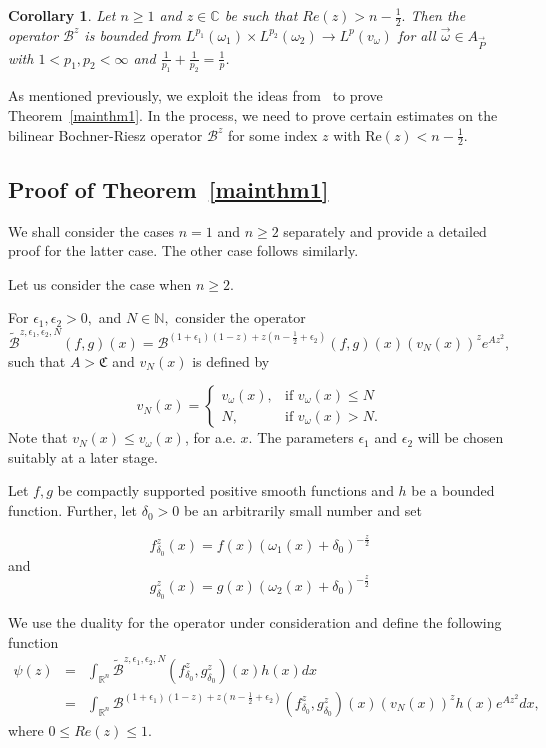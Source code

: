 \documentclass[a4paper,12pt]{amsart}
\newtheorem{corollary}[theorem]{Corollary}
\begin{document}
\begin{corollary}\label{cor:weigh} Let $n\geq 1$ and $z\in \mathbb C$ be such that $Re(z)>n-\frac{1}{2}.$ Then the operator $\mathcal {B}^{z}$ is bounded from $L^{p_{1}}(\omega_{1})\times L^{p_{2}}(\omega_{2})\rightarrow L^{p}(v_{\omega})$ for all $\vec{\omega}\in A_{\vec{P}}$ with $1<p_{1}, p_{2}<\infty$ and $\frac{1}{p_{1}}+\frac{1}{p_{2}}=\frac{1}{p}$.
\end{corollary} 
As mentioned previously, we exploit the ideas from~\cite{XQ} to prove Theorem~\ref{mainthm1}. In the process, we need to prove certain estimates on the bilinear Bochner-Riesz operator $\mathcal B^{z}$ for some index $z$ with $\text{Re}(z)<n-\frac{1}{2}.$ 
\subsection{Proof of Theorem~\ref{mainthm1} }

We shall consider the  cases $n=1$ and $n\geq 2$ separately and provide a detailed proof for the latter case. The other case follows similarly.  

Let us consider the case when $n\geq 2$. 

For $\epsilon_1,\epsilon_2>0,$ and $N\in \mathbb N,$ consider the operator 
$$\tilde{\mathcal {B}}^{z,\epsilon_{1},\epsilon_{2},N}(f,g)(x)=\mathcal {B}^{(1+\epsilon_{1})(1-z)+z(n-\frac{1}{2}+\epsilon_{2})}(f,g)(x)(v_{N}(x))^{z}e^{A z^{2}},$$ 
such that $A>\mathfrak{C}$ and $v_{N}(x)$ is defined by

$$ v_{N}(x)= \begin{cases} v_{\omega}(x), & \mbox{if }  v_{\omega}(x)\leq N \\ N, & \mbox{if }v_{\omega}(x)>N. \end{cases}$$
Note that $v_{N}(x)\leq v_{\omega}(x)$, for a.e. $x$.
The parameters $\epsilon_1$ and $\epsilon_2$ will be chosen suitably at a later stage. 

Let $f,g$ be compactly supported positive smooth functions and $h$ be a bounded function. Further, let  $\delta_{0}>0$ be an arbitrarily small number and set 

$$f^{z}_{\delta_{0}}(x)=f(x)(\omega_{1}(x)+\delta_{0})^{-\frac{z}{2}}$$ and $$g^{z}_{\delta_{0}}(x)=g(x)(\omega_{2}(x)+\delta_{0})^{-\frac{z}{2}}$$

We use the duality for the operator under consideration and define the following function 
\begin{eqnarray*}
 \psi(z)&=&\int_{\mathbb{R}^{n}}\tilde{\mathcal {B}}^{z,\epsilon_{1},\epsilon_{2},N}(f^{z}_{\delta_{0}},g^{z}_{\delta_{0}})(x)h(x)dx \\ &=&\int_{\mathbb{R}^{n}}\mathcal {B}^{(1+\epsilon_{1})(1-z)+z(n-\frac{1}{2}+\epsilon_{2})}(f^{z}_{\delta_{0}},g^{z}_{\delta_{0}})(x)(v_{N}(x))^{z}h(x)e^{A z^{2}}dx,
\end{eqnarray*}
where  $0\leq Re(z)\leq 1$. 
\end{document}
